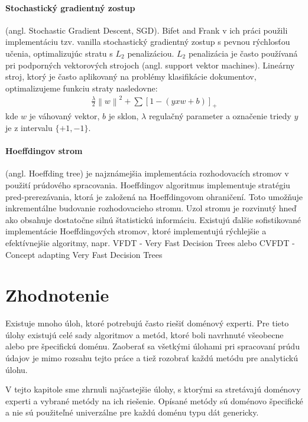 \paragraph{Stochastický gradientný zostup} (angl. Stochastic Gradient Descent, SGD). Bifet and Frank v ich práci použili implementáciu tzv. vanilla stochastický gradientný zostup s pevnou rýchlosťou učenia, optimalizujúc stratu s $L_2$ penalizáciou. $L_2$ penalizácia je často používaná pri podporných vektorových strojoch (angl. support vektor machines). Lineárny stroj, ktorý je často aplikovaný na problémy klasifikácie dokumentov, optimalizujeme funkciu straty nasledovne:
\begin{align*}
\frac{\lambda }{2}\left \| w \right \|^{2}+\sum [1-(yxw + b)]_{+}
\end{align*}
kde $w$ je váhovaný vektor, $b$ je sklon, $\lambda$ regulačný parameter a označenie triedy $y$ je z intervalu $\{+1, -1\}$.

\paragraph{Hoeffdingov strom} (angl. Hoeffding tree) je najznámejšia implementácia rozhodovacích stromov v použití prúdového spracovania. Hoeffdingov algoritmus implementuje stratégiu pred-prerezávania, ktorá je založená na Hoeffdingovom ohraničení. Toto umožňuje inkrementálne budovanie rozhodovacieho stromu. Uzol stromu je rozvinutý hneď ako obsahuje dostatočne silnú štatistickú informáciu. Existujú ďalšie sofistikované implementácie Hoeffdingových stromov, ktoré implementujú rýchlejšie a efektívnejšie algoritmy, napr. VFDT - Very Fast Decision Trees \citep{domingos2000mining} alebo CVFDT - Concept adapting Very Fast Decision Trees \citep{hulten2001mining}


\section{Zhodnotenie}
Existuje mnoho úloh, ktoré potrebujú často riešiť doménový experti. Pre tieto úlohy existujú celé sady algoritmov a metód, ktoré boli navrhnuté všeobecne alebo pre špecifickú doménu. Zaoberať sa všetkými úlohami pri spracovaní prúdu údajov je mimo rozsahu tejto práce a tiež rozobrať každú metódu pre analytickú úlohu.  \par
V tejto kapitole sme zhrnuli najčastejšie úlohy, s ktorými sa stretávajú doménovy experti a vybrané metódy na ich riešenie. Opísané metódy sú doménovo špecifické a nie sú použiteľné univerzálne pre každú doménu typu dát genericky.